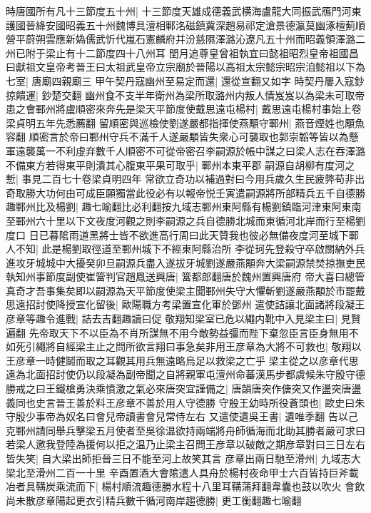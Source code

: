 時唐國所有凡十三節度五十州|{
	十三節度天雄成德義武横海盧龍大同振武鴈門河東護國晉絳安國昭義五十州魏博具澶相鄆洺磁鎮冀深趙易祁定滄景德瀛莫幽涿檀薊順營平蔚朔雲應新媯儒武忻代嵐石憲麟府并汾慈隰澤潞沁遼凡五十州而昭義領澤潞二州已附于梁止有十二節度四十八州耳}
閏月追尊皇曾祖執宜曰懿祖昭烈皇帝祖國昌曰獻祖文皇帝考晉王曰太祖武皇帝立宗廟於晉陽以高祖太宗懿宗昭宗洎懿祖以下為七室|{
	唐廟四親廟三}
甲午契丹寇幽州至易定而還|{
	還從宣翻又如字}
時契丹屢入寇鈔掠饋運|{
	鈔楚交翻}
幽州食不支半年衛州為梁所取潞州内叛人情岌岌以為梁未可取帝患之會鄆州將盧順密來奔先是梁天平節度使戴思遠屯楊村|{
	戴思遠屯楊村事始上卷梁貞明五年先悉薦翻}
留順密與巡檢使劉遂嚴都指揮使燕顒守鄆州|{
	燕音煙姓也顒魚容翻}
順密言於帝曰鄆州守兵不滿千人遂嚴顒皆失衆心可襲取也郭崇韜等皆以為懸軍遠襲萬一不利虛弃數千人順密不可從帝密召李嗣源於帳中謀之曰梁人志在吞澤潞不備東方若得東平則潰其心腹東平果可取乎|{
	鄆州本東平郡}
嗣源自胡柳有度河之慙|{
	事見二百七十卷梁貞明四年}
常欲立奇功以補過對曰今用兵歲久生民疲弊苟非出奇取勝大功何由可成臣願獨當此役必有以報帝悦壬寅遣嗣源將所部精兵五千自德勝趣鄆州比及楊劉|{
	趣七喻翻比必利翻按九域志鄆州東阿縣有楊劉鎮臨河津東阿東南至鄆州六十里以下文夜度河觀之則李嗣源之兵自德勝北城而東循河北岸而行至楊劉度口}
日已暮隂雨道黑將士皆不欲進高行周曰此天贊我也彼必無備夜度河至城下鄆人不知|{
	此是楊劉取徑道至鄆州城下不經東阿縣治所}
李從珂先登殺守卒啟關納外兵進攻牙城城中大擾癸卯旦嗣源兵盡入遂拔牙城劉遂嚴燕顒奔大梁嗣源禁焚掠撫吏民執知州事節度副使崔簹判官趙鳳送興唐|{
	簹都郎翻唐於魏州置興唐府}
帝大喜曰總管真奇才吾事集矣即以嗣源為天平節度使梁主聞鄆州失守大懼斬劉遂嚴燕顒於市罷戴思遠招討使降授宣化留後|{
	歐陽職方考梁置宣化軍於鄧州}
遣使詰讓北面諸將段凝王彦章等趣令進戰|{
	詰去吉翻趣讀曰促}
敬翔知梁室已危以繩内靴中入見梁主曰|{
	見賢遍翻}
先帝取天下不以臣為不肖所謀無不用今敵勢益彊而陛下棄忽臣言臣身無用不如死引繩將自經梁主止之問所欲言翔曰事急矣非用王彦章為大將不可救也|{
	敬翔以王彦章一時健鬬而取之耳觀其用兵無遠略烏足以救梁之亡乎}
梁主從之以彦章代思遠為北面招討使仍以段凝為副帝聞之自將親軍屯澶州命蕃漢馬步都虞候朱守殷守德勝戒之曰王鐵槍勇決乘憤激之氣必來唐突宜謹備之|{
	唐韻唐突作傏突又作盪突唐盪義同也史言晉王善於料王彦章不善於用人守德勝}
守殷王幼時所役蒼頭也|{
	歐史曰朱守殷少事帝為奴名曰會兒帝讀書會兒常侍左右}
又遣使遺吳王書|{
	遺唯季翻}
告以己克鄆州請同舉兵擊梁五月使者至吳徐温欲持兩端將舟師循海而北助其勝者嚴可求曰若梁人邀我登陸為援何以拒之温乃止梁主召問王彦章以破敵之期彦章對曰三日左右皆失笑|{
	自大梁出師拒晉三日不能至河上故笑其言}
彦章出兩日馳至滑州|{
	九域志大梁北至滑州二百一十里}
辛酉置酒大會隂遣人具舟於楊村夜命甲士六百皆持巨斧載冶者具鞲炭乘流而下|{
	楊村順流趣德勝水程十八里耳鞲蒲拜翻韋囊也鼓以吹火}
會飲尚未散彦章陽起更衣引精兵數千循河南岸趨德勝|{
	更工衡翻趣七喻翻}
